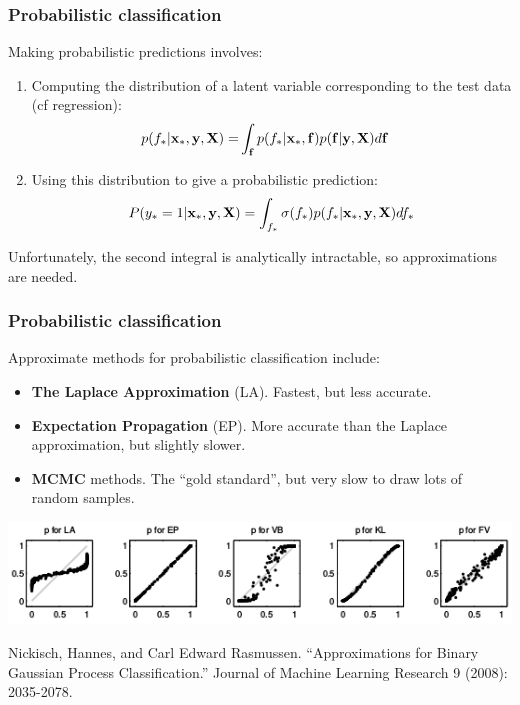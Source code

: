 \begin{frame}
\frametitle{Probabilistic classification}
Making probabilistic predictions involves:
\begin{enumerate}
\item Computing the distribution of a latent variable corresponding to the test data (cf regression):
\begin{align*}
p(f_* | {\bf x}_*, {\bf y}, {\bf X}) = & \int_{\bf f} p(f_* | {\bf x}_*, {\bf f}) p({\bf f}|{\bf y},{\bf X}) d{\bf f}
\end{align*}
\item Using this distribution to give a probabilistic prediction:
\begin{align*}
P(y_*=1|{\bf x}_*,{\bf y},{\bf X}) = \int_{f_*} \sigma(f_*) p(f_*|{\bf x}_*,{\bf y},{\bf X}) df_*
\end{align*}
\end{enumerate}
Unfortunately, the second integral is analytically intractable, so approximations are needed.\par
\end{frame}

\begin{frame}
\frametitle{Probabilistic classification}
Approximate methods for probabilistic classification include:
\begin{itemize}
\item {\bf The Laplace Approximation} (LA).  Fastest, but less accurate.
\item {\bf Expectation Propagation} (EP).  More accurate than the Laplace approximation, but slightly slower.
\item {\bf MCMC} methods. The ``gold standard'', but very slow to draw lots of random samples.
\end{itemize}
\vspace{0.25cm}
\includegraphics[width=\textwidth]{nickisch_figure}
\begin{tiny}
Nickisch, Hannes, and Carl Edward Rasmussen. ``Approximations for Binary Gaussian Process Classification.'' Journal of Machine Learning Research 9 (2008): 2035-2078.\par
\end{tiny}
\end{frame}


